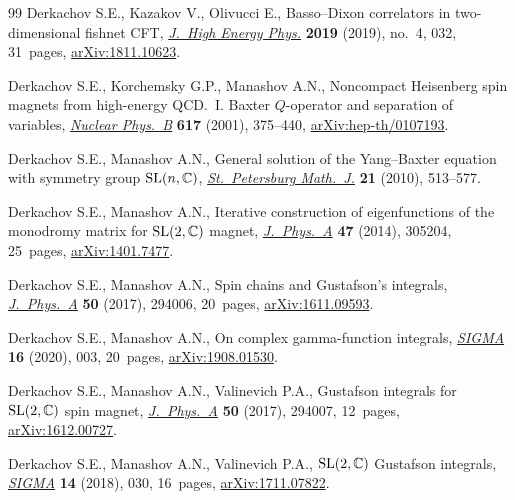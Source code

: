 \documentclass[10pt,a4paper]{amsart}
\numberwithin{equation}{section}
\begin{document}
\begin{thebibliography}{99}
Derkachov S.E., Kazakov V., Olivucci E., Basso--{D}ixon correlators in
 two-dimensional fishnet {CFT},
 \href{https://doi.org/10.1007/jhep04(2019)032}{\textit{J.~High Energy Phys.}}
 \textbf{2019} (2019), no.~4, 032, 31~pages,
 \href{http://arxiv.org/abs/1811.10623}{arXiv:1811.10623}.

Derkachov S.E., Korchemsky G.P., Manashov A.N., Noncompact {H}eisenberg spin
 magnets from high-energy {QCD}.~{I}. {B}axter {$Q$}-operator and separation
 of variables,
 \href{https://doi.org/10.1016/S0550-3213(01)00457-6}{\textit{Nuclear
 Phys.~B}} \textbf{617} (2001), 375--440,
 \href{http://arxiv.org/abs/hep-th/0107193}{arXiv:hep-th/0107193}.

Derkachov S.E., Manashov A.N., General solution of the {Y}ang--{B}axter
 equation with symmetry group {${\rm SL}(n,\mathbb{C})$},
 \href{https://doi.org/10.1090/S1061-0022-2010-01106-3}{\textit{St.~Petersburg
 Math.~J.}} \textbf{21} (2010), 513--577.

Derkachov S.E., Manashov A.N., Iterative construction of eigenfunctions of the
 monodromy matrix for {${\rm SL}(2,\mathbb{C})$} magnet,
 \href{https://doi.org/10.1088/1751-8113/47/30/305204}{\textit{J.~Phys.~A}}
 \textbf{47} (2014), 305204, 25~pages,
 \href{http://arxiv.org/abs/1401.7477}{arXiv:1401.7477}.

Derkachov S.E., Manashov A.N., Spin chains and {G}ustafson's integrals,
 \href{https://doi.org/10.1088/1751-8121/aa749a}{\textit{J.~Phys.~A}}
 \textbf{50} (2017), 294006, 20~pages,
 \href{http://arxiv.org/abs/1611.09593}{arXiv:1611.09593}.

Derkachov S.E., Manashov A.N.,
On complex gamma-function integrals,
\href{https://doi.org/10.3842/SIGMA.2020.003}{\textit{SIGMA}} \textbf{16} (2020), 003, 20~pages,
\href{http://arxiv.org/abs/1908.01530}{arXiv:1908.01530}.


Derkachov S.E., Manashov A.N., Valinevich P.A., Gustafson integrals for {${\rm
 SL}(2,\mathbb{C})$} spin magnet,
 \href{https://doi.org/10.1088/1751-8121/aa7480}{\textit{J.~Phys.~A}}
 \textbf{50} (2017), 294007, 12~pages,
 \href{http://arxiv.org/abs/1612.00727}{arXiv:1612.00727}.

Derkachov S.E., Manashov A.N., Valinevich P.A., {${\rm SL}(2,\mathbb{C})$}
 {G}ustafson integrals,
 \href{https://doi.org/10.3842/SIGMA.2018.030}{\textit{SIGMA}} \textbf{14}
 (2018), 030, 16~pages,
 \href{http://arxiv.org/abs/1711.07822}{arXiv:1711.07822}.


\end{thebibliography}
\end{document}
